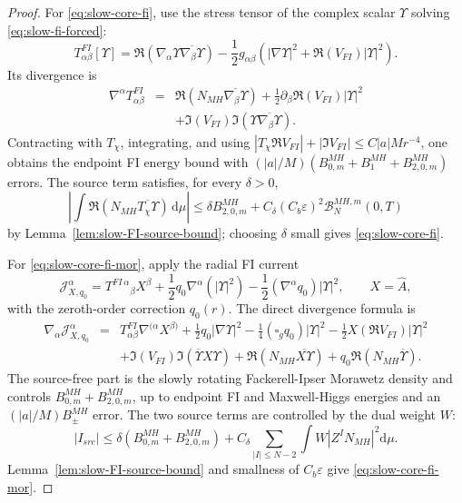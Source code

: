 \documentclass[11pt]{article}
\numberwithin{equation}{section}
\theoremstyle{plain}
\theoremstyle{definition}
\theoremstyle{remark}
\newcommand{\dd}{\mathrm{d}}
\begin{document}
\begin{proof}
For \eqref{eq:slow-core-fi}, use the stress tensor of the complex scalar \(\Upsilon\) solving \eqref{eq:slow-fi-forced}:
\begin{equation}
T^{FI}_{\alpha\beta}[\Upsilon]
=\Re(\nabla_\alpha\Upsilon\overline{\nabla_\beta\Upsilon})
-\frac12g_{\alpha\beta}\left(|\nabla\Upsilon|^2+\Re(V_{FI})|\Upsilon|^2\right).
\end{equation}
Its divergence is
\begin{eqnarray}
\nabla^\alpha T^{FI}_{\alpha\beta}
&=&
\Re(N_{MH}\overline{\nabla_\beta\Upsilon})
+\frac12\partial_\beta\Re(V_{FI})|\Upsilon|^2
\nonumber\\
&&+\Im(V_{FI})\Im(\Upsilon\overline{\nabla_\beta\Upsilon}).
\end{eqnarray}
Contracting with \(T_\chi\), integrating, and using \(|T_\chi\Re V_{FI}|+|\Im V_{FI}|\le C|a|Mr^{-4}\), one obtains the endpoint FI energy bound with \((|a|/M)(B_{0,m}^{MH}+B_1^{MH}+B_{2,0,m}^{MH})\) errors.  The source term satisfies, for every \(\delta>0\),
\begin{equation}
\left|\int \Re(N_{MH}\overline{T_\chi\Upsilon})\,\dd\mu\right|
\le \delta B_{2,0,m}^{MH}
+C_\delta(C_b\varepsilon)^2\mathcal B_N^{MH,m}(0,T)
\end{equation}
by Lemma~\ref{lem:slow-FI-source-bound}; choosing \(\delta\) small gives \eqref{eq:slow-core-fi}.

For \eqref{eq:slow-core-fi-mor}, apply the radial FI current
\begin{equation}
\mathcal J^\alpha_{X,q_0}
=T^{FI\,\alpha}{}_{\beta}X^\beta
+\frac12q_0\nabla^\alpha(|\Upsilon|^2)
-\frac12(\nabla^\alpha q_0)|\Upsilon|^2,
\qquad X=\widehat A,
\end{equation}
with the zeroth-order correction \(q_0(r)\).  The direct divergence formula is
\begin{eqnarray}
\nabla_\alpha\mathcal J^\alpha_{X,q_0}
&=&T^{FI}_{\alpha\beta}\nabla^{(\alpha}X^{\beta)}
+\frac12q_0|\nabla\Upsilon|^2
-\frac14(\square_gq_0)|\Upsilon|^2
-\frac12X(\Re V_{FI})|\Upsilon|^2
\nonumber\\
&&+\Im(V_{FI})\Im(\overline\Upsilon X\Upsilon)
+\Re(N_{MH}\overline{X\Upsilon})
+q_0\Re(N_{MH}\overline\Upsilon).
\end{eqnarray}
The source-free part is the slowly rotating Fackerell-Ipser Morawetz density and controls \(B_{0,m}^{MH}+B_{2,0,m}^{MH}\), up to endpoint FI and Maxwell-Higgs energies and an \((|a|/M)B_{\pm}^{MH}\) error.  The two source terms are controlled by the dual weight \(W\):
\begin{equation}
 |I_{src}|
\le \delta(B_{0,m}^{MH}+B_{2,0,m}^{MH})
+C_\delta\sum_{|I|\le N-2}\int W|Z^IN_{MH}|^2\dd\mu.
\end{equation}
Lemma~\ref{lem:slow-FI-source-bound} and smallness of \(C_b\varepsilon\) give \eqref{eq:slow-core-fi-mor}.


\end{proof}
\end{document}
